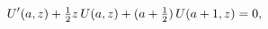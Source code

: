 \[\mathop{U\/}\nolimits'\!\left(a,z\right)+\tfrac{1}{2}z\mathop{U\/}\nolimits\!%
\left(a,z\right)+(a+\tfrac{1}{2})\mathop{U\/}\nolimits\!\left(a+1,z\right)=0,\]